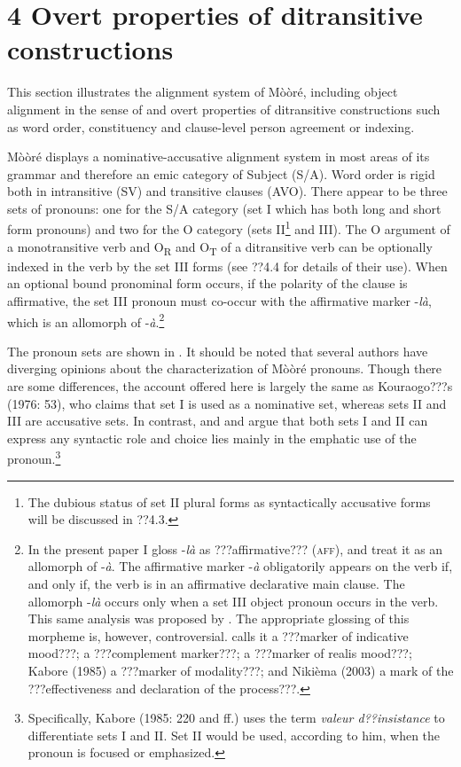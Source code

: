 \documentclass[output=paper]{langsci/langscibook}
\begin{document}
\section{4 Overt properties of ditransitive constructions }

This section illustrates the alignment system of Mòòré, including object alignment in the sense of \citet{MalchukovEtAl2010} and overt properties of ditransitive constructions such as word order, constituency and clause-level person agreement or indexing.


Mòòré displays a nominative-accusative alignment system in most areas of its grammar and therefore an emic category of Subject (S/A). Word order is rigid both in intransitive (SV) and transitive clauses (AVO). There appear to be three sets of pronouns: one for the S/A category (set I which has both long and short form pronouns) and two for the O category (sets II\footnote{ The dubious status of set II plural forms as syntactically accusative forms will be discussed in ??4.3.}{ }and III). The O argument of a monotransitive verb and O\textsubscript{R} and O\textsubscript{T} of a ditransitive verb can be optionally indexed in the verb by the set III forms (see ??4.4 for details of their use). When an optional bound pronominal form occurs, if the polarity of the clause is affirmative, the set III pronoun must co-occur with the affirmative marker -\textit{là}, which is an allomorph of -\textit{à}.\footnote{{In the present paper I gloss -}{\textit{là}}{ as ???affirmative??? (}{\textsc{aff}}{), and treat it as an allomorph of -}{\textit{à}}{. The affirmative marker -}{\textit{à}}{ obligatorily appears on the verb if, and only if, the verb is in an affirmative declarative main clause. The allomorph -}{\textit{là}}{ occurs only when a set III object pronoun occurs in the verb. This same analysis was proposed by \citet{Manessy1963}. The appropriate glossing of this morpheme is, however, controversial. \citet[96]{Alexandre1953} calls it a ???marker of indicative mood???; \citet[112]{Peterson1971} a ???complement marker???; \citet{Canu1976} a ???marker of realis mood???; Kabore} {(1985) a ???marker of modality???; and Nikièma (2003) a mark of the ???effectiveness and declaration of the process???.}} 

The pronoun sets are shown in . It should be noted that several authors have diverging opinions about the characterization of Mòòré pronouns. Though there are some differences, the account offered here is largely the same as Kouraogo???s (1976: 53), who claims that set I is used as a nominative set, whereas sets II and III are accusative sets. In contrast, \citet{Canu1974} and \citet{Kabore1985} and argue that both sets I and II can express any syntactic role and choice lies mainly in the emphatic use of the pronoun.\footnote{ Specifically, Kabore (1985: 220 and ff.) uses the term \textit{valeur d??insistance} to differentiate sets I and II. Set II would be used, according to him, when the pronoun is focused or emphasized. }{ }
\end{document}
